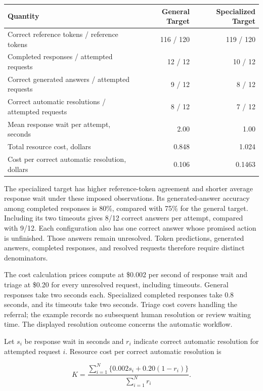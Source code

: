 \begin{table}[H]
\centering\small
\begin{tabular}{@{}lrr@{}}
\toprule
Quantity & General Target & Specialized Target \\
\midrule

Correct reference tokens / reference tokens & 116 / 120 & 119 / 120 \\
Completed responses / attempted requests & 12 / 12 & 10 / 12 \\
Correct generated answers / attempted requests & 9 / 12 & 8 / 12 \\
Correct automatic resolutions / attempted requests & 8 / 12 & 7 / 12 \\
Mean response wait per attempt, seconds & 2.00 & 1.00 \\
Total resource cost, dollars & 0.848 & 1.024 \\
Cost per correct automatic resolution, dollars & 0.106 & 0.1463 \\
\bottomrule
\end{tabular}
\end{table}

The specialized target has higher reference-token agreement and shorter
average response wait under these imposed observations. Its
generated-answer accuracy among completed responses is 80\%, compared
with 75\% for the general target. Including its two timeouts gives 8/12
correct answers per attempt, compared with 9/12. Each configuration also
has one correct answer whose promised action is unfinished. Those
answers remain unresolved. Token predictions, generated answers,
completed responses, and resolved requests therefore require distinct
denominators.

The cost calculation prices compute at \$0.002 per second of response
wait and triage at \$0.20 for every unresolved request, including
timeouts. General responses take two seconds each. Specialized completed
responses take 0.8 seconds, and its timeouts take two seconds. Triage
cost covers handling the referral; the example records no subsequent
human resolution or review waiting time. The displayed resolution
outcome concerns the automatic workflow.

Let \(s_i\) be response wait in seconds and \(r_i\) indicate correct
automatic resolution for attempted request \(i\). Resource cost per
correct automatic resolution is

\[
K=\frac{\sum_{i=1}^{N}\{0.002s_i+0.20(1-r_i)\}}{\sum_{i=1}^{N}r_i}.
\]

